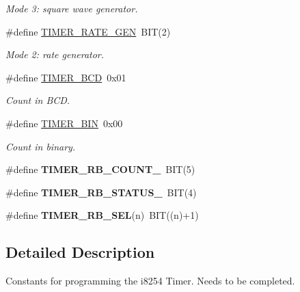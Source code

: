\begin{DoxyCompactItemize}
$$\begin{DoxyCompactList}\small\item\em Mode 3\+: square wave generator. \end{DoxyCompactList}\item 
\mbox{\label{group__i8254_ga5d4449e0fa1cf4a4d107a48a04a1265f}} 
\#define \hyperlink{group__i8254_ga5d4449e0fa1cf4a4d107a48a04a1265f}{T\+I\+M\+E\+R\+\_\+\+R\+A\+T\+E\+\_\+\+G\+EN}~B\+IT(2)
\begin{DoxyCompactList}\small\item\em Mode 2\+: rate generator. \end{DoxyCompactList}\item 
\mbox{\label{group__i8254_ga325b992a371d5d981c4eceff42fa5956}} 
\#define \hyperlink{group__i8254_ga325b992a371d5d981c4eceff42fa5956}{T\+I\+M\+E\+R\+\_\+\+B\+CD}~0x01
\begin{DoxyCompactList}\small\item\em Count in B\+CD. \end{DoxyCompactList}\item 
\mbox{\label{group__i8254_gad2913dcf2f91453317bd035589ac0a7d}} 
\#define \hyperlink{group__i8254_gad2913dcf2f91453317bd035589ac0a7d}{T\+I\+M\+E\+R\+\_\+\+B\+IN}~0x00
\begin{DoxyCompactList}\small\item\em Count in binary. \end{DoxyCompactList}\item 
\mbox{\label{group__i8254_ga6c248216df24b5e9d907d126d80bd195}} 
\#define {\bfseries T\+I\+M\+E\+R\+\_\+\+R\+B\+\_\+\+C\+O\+U\+N\+T\+\_\+}~B\+IT(5)
\item 
\mbox{\label{group__i8254_ga08b4952bb7058684a3f8f66be04dd45e}} 
\#define {\bfseries T\+I\+M\+E\+R\+\_\+\+R\+B\+\_\+\+S\+T\+A\+T\+U\+S\+\_\+}~B\+IT(4)
\item 
\mbox{\label{group__i8254_gaf598b17740e07842a0545af512714711}} 
\#define {\bfseries T\+I\+M\+E\+R\+\_\+\+R\+B\+\_\+\+S\+EL}(n)~B\+IT((n)+1)
\end{DoxyCompactItemize}


\subsection{Detailed Description}
Constants for programming the i8254 Timer. Needs to be completed. 